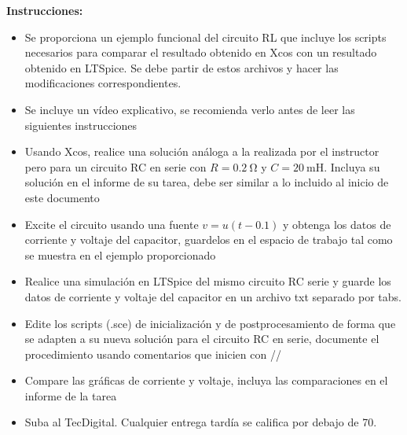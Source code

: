 \documentclass[12pt]{article}
\begin{document}
\noindent\textbf{Instrucciones:}
\begin{itemize}
    \item Se proporciona un ejemplo funcional del circuito RL que incluye los scripts necesarios para comparar el resultado obtenido en Xcos con un resultado obtenido en LTSpice. Se debe partir de estos archivos y hacer las modificaciones correspondientes. 
    \item Se incluye un vídeo explicativo, se recomienda verlo antes de leer las siguientes instrucciones
    \item Usando Xcos, realice una solución análoga a la realizada por el instructor pero para un circuito RC en serie con $R=\SI{0.2}{\ohm}$ y $C=\SI{20}{\milli\henry}$. Incluya su solución en el informe de su tarea, debe ser similar a lo incluido al inicio de este documento 
    \item Excite el circuito usando una fuente $v=u(t-0.1)$ y obtenga los datos de corriente y voltaje del capacitor, guardelos en el espacio de trabajo tal como se muestra en el ejemplo proporcionado
    \item Realice una simulación en LTSpice del mismo circuito RC serie y guarde los datos de corriente y voltaje del capacitor en un archivo txt separado por tabs.
    \item Edite los scripts (.sce) de inicialización y de postprocesamiento de forma que se adapten a su nueva solución para el circuito RC en serie, documente el procedimiento usando comentarios que inicien con //
    \item Compare las gráficas de corriente y voltaje, incluya las comparaciones en el informe de la tarea
    \item Suba al TecDigital. Cualquier entrega tardía se califica por debajo de 70. 
\end{itemize}
\end{document}
